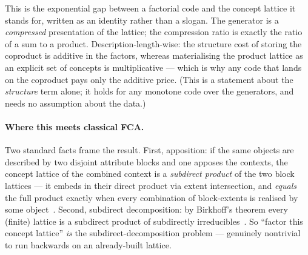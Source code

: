 \documentclass[11pt]{article}
\theoremstyle{definition}
\theoremstyle{plain}
\theoremstyle{remark}
\begin{document}
This is the exponential gap between a factorial code and the concept lattice it
stands for, written as an identity rather than a slogan. The generator is a
\emph{compressed} presentation of the lattice; the compression ratio is exactly
the ratio of a sum to a product. Description-length-wise: the structure cost of
storing the coproduct is additive in the factors, whereas materialising the
product lattice as an explicit set of concepts is multiplicative --- which is why
any code that lands on the coproduct pays only the additive price. (This is a
statement about the \emph{structure} term alone; it holds for any monotone code
over the generators, and needs no assumption about the data.)

\paragraph{Where this meets classical FCA.} Two standard facts frame the result.
First, apposition: if the same objects are described by two disjoint attribute
blocks and one apposes the contexts, the concept lattice of the combined context
is a \emph{subdirect product} of the two block lattices --- it embeds in their
direct product via extent intersection, and \emph{equals} the full product
exactly when every combination of block-extents is realised by some
object~\cite{ganter1999}. Second, subdirect decomposition: by Birkhoff's theorem
every (finite) lattice is a subdirect product of subdirectly
irreducibles~\cite{birkhoff1944,davey2002}. So ``factor this concept lattice''
\emph{is} the subdirect-decomposition problem --- genuinely nontrivial to run
backwards on an already-built lattice.
\end{document}
